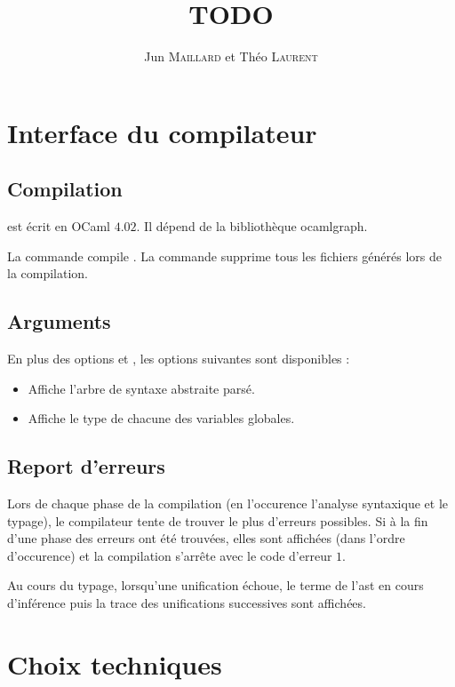 \documentclass[a4paper]{article}
\title{TODO}
\author{Jun \textsc{Maillard} et Théo \textsc{Laurent}}
\begin{document}
\maketitle


\section{Interface du compilateur}

\subsection{Compilation}
 est écrit en OCaml $4.02$. Il dépend de la bibliothèque ocamlgraph.

La commande  compile .
La commande  supprime tous les fichiers générés lors de la compilation.

\subsection{Arguments}
En plus des options  et , les options suivantes sont disponibles :
\begin{itemize}
\item[\PVerb{--print-ast}] Affiche l'arbre de syntaxe abstraite parsé.
\item[\PVerb{--print-type}] Affiche le type de chacune des variables globales.
\end{itemize}

\subsection{Report d'erreurs}
Lors de chaque phase de la compilation (en l'occurence l'analyse syntaxique et le typage), le compilateur tente de trouver le plus d'erreurs possibles. Si à la fin d'une phase des erreurs ont été trouvées, elles sont affichées (dans l'ordre d'occurence) et la compilation s'arrête avec le code d'erreur $1$.

Au cours du typage, lorsqu'une unification échoue, le terme de l'ast en cours d'inférence puis la trace des unifications successives sont affichées.

\section{Choix techniques}
\end{document}
